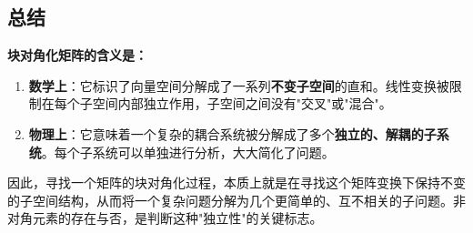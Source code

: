 \subsection{总结}

\textbf{块对角化矩阵的含义是：}

\begin{enumerate}
	\item \textbf{数学上}：它标识了向量空间分解成了一系列\textbf{不变子空间}的直和。线性变换被限制在每个子空间内部独立作用，子空间之间没有"交叉"或"混合"。
	\item \textbf{物理上}：它意味着一个复杂的耦合系统被分解成了多个\textbf{独立的、解耦的子系统}。每个子系统可以单独进行分析，大大简化了问题。
\end{enumerate}

因此，寻找一个矩阵的块对角化过程，本质上就是在寻找这个矩阵变换下保持不变的子空间结构，从而将一个复杂问题分解为几个更简单的、互不相关的子问题。非对角元素的存在与否，是判断这种"独立性"的关键标志。